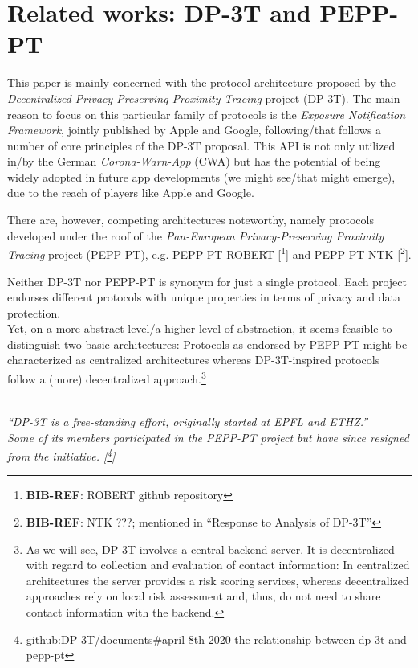\documentclass{article}
\newcommand*{\TODO}[2][todoC]{{\color{#1} #2}}
\newcommand*{\TODOsty}[2][styC]{\TODO[#1]{#2}}
\newcommand*{\TODOnsr}[2][nsrC]{\TODO[#1]{#2}}
\newcommand*{\NOTE}[2][noteC]{\TODO[#1]{\textit{#2}}}
\newcommand*{\TODOfn}[2][noteC]{\TODO[#1]{[\footnote{\TODO[#1]{#2}}]}}
\newcommand*{\TODOref}[2][todoC]{\TODOfn[#1]{\textbf{BIB-REF}: #2}}
\begin{document}
\section{Related works: DP-3T and PEPP-PT}
%
This paper \TODOnsr{is mainly concerned} with the \TODOnsr{protocol architecture} proposed by the \textit{Decentralized Privacy-Preserving Proximity Tracing} project (DP-3T).
The main reason to focus \TODOnsr{on} this particular family of protocols is the \textit{Exposure Notification Framework}, \TODOsty{jointly published} by Apple and Google, \TODOsty{following/that follows} a number of core principles of the DP-3T proposal. This API is not only utilized \TODOsty{in/by} the German \textit{Corona-Warn-App} (CWA) but has the potential of being widely adopted in future app developments \TODOsty{(we might see/that might emerge)}, due to the reach of \TODOsty{players like Apple and Google}.

There are, however, competing architectures noteworthy, namely protocols developed under the roof of the \textit{Pan-European Privacy-Preserving Proximity Tracing} project (PEPP-PT), e.g. PEPP-PT-ROBERT\TODOref{ROBERT github repository} and PEPP-PT-NTK\TODOref{NTK ???; mentioned in ``Response to Analysis of DP-3T''}.

Neither DP-3T nor PEPP-PT \TODOnsr{is synonym for} just a single protocol. Each project endorses different protocols with unique properties in terms of privacy and data protection.\\
Yet, on \TODOsty{a more abstract level/a higher level of abstraction}, it seems \TODOnsr{feasible} to distinguish two basic architectures: Protocols \TODOnsr{as} endorsed by PEPP-PT might be characterized as centralized architectures whereas DP-3T-inspired protocols follow a (more) decentralized approach.\footnote{%
  \TODOsty{As we will see}, DP-3T involves a central backend server. It is decentralized with regard to \TODOsty{collection and evaluation} of contact information:
  In centralized architectures the server provides a risk scoring services, whereas decentralized approaches rely on local risk assessment and, thus, do not need to share contact information with the \TODOnsr{backend}.}

\NOTE{%
  \vspace{.25em}\\
  ``DP-3T is a free-standing effort, originally started at EPFL and ETHZ.''\\
  Some of its members participated in the PEPP-PT project but have since
  resigned from the initiative.\TODOfn[noteC]{%
    github:DP-3T/documents\#april-8th-2020-the-relationship-between-dp-3t-and-pepp-pt
  }}
\end{document}
